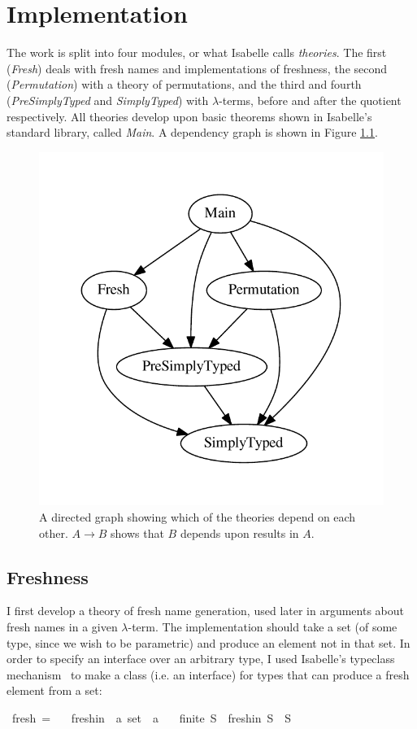 \chapter{Implementation}
The work is split into four modules, or what Isabelle calls \emph{theories}.
The first (\emph{Fresh}) deals with fresh names and implementations of freshness, the second (\emph{Permutation}) with a theory of permutations, and the third and fourth (\emph{PreSimplyTyped} and \emph{SimplyTyped}) with \(\lambda\)-terms, before and after the quotient respectively.
All theories develop upon basic theorems shown in Isabelle's standard library, called \emph{Main}.
A dependency graph is shown in Figure \ref{fig:dependencies}.

\begin{figure}
\centering
\includegraphics[width=.5\textwidth]{chapters/implementation/figures/dependencies}
\caption{A directed graph showing which of the theories depend on each other. \(A \to B\) shows that \(B\) depends upon results in \(A\).}
\label{fig:dependencies}
\end{figure}

\section{Freshness}
I first develop a theory of fresh name generation, used later in arguments about fresh names in a given \(\lambda\)-term.
The implementation should take a set (of some type, since we wish to be parametric) and produce an element not in that set.
In order to specify an interface over an arbitrary type, I used Isabelle's typeclass mechanism~\cite{isabelle-typeclasses} to make a class (i.e. an interface) for types that can produce a fresh element from a set:

\begin{implementation}
\isamarkupfalse%
\ fresh\ =\isanewline
\ \ \ fresh{\isacharunderscore}in\ {\isacharcolon}{\isacharcolon}\ {\isachardoublequoteopen}{\isacharprime}a\ set\ {\isasymRightarrow}\ {\isacharprime}a{\isachardoublequoteclose}\isanewline
\ \ \ {\isachardoublequoteopen}finite\ S\ {\isasymLongrightarrow}\ fresh{\isacharunderscore}in\ S\ {\isasymnotin}\ S{\isachardoublequoteclose}\isanewline
\end{implementation}


